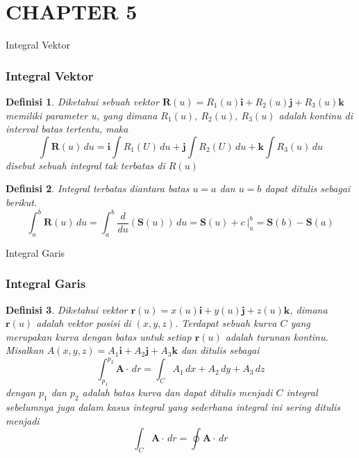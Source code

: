 \documentclass[10pt]{beamer}
\newtheorem{definisi}{Definisi}
\begin{document}
\section{CHAPTER 5}
\begin{frame}{Integral Vektor}
    \frametitle{Integral Vektor}
    \justifying
    \begin{definisi}
    Diketahui sebuah vektor $\mathbf{R}(u) = R_1(u)\mathbf{i} + R_{2}(u)\mathbf{j} + R_{3}(u)\mathbf{k}$ memiliki parameter u, yang dimana $R_{1}(u),\ R_{2}(u),\ R_{3}(u)$ adalah kontinu di interval batas tertentu, maka
    \[\int \mathbf{R}(u)\, du = \mathbf{i} \int R_{1}(U)\, du + \mathbf{j} \int R_{2}(U)\, du + \mathbf{k} \int R_{3}(u)\, du\]
    disebut sebuah integral tak terbatas di $R(u)$
    \end{definisi}
    \begin{definisi}
        Integral terbatas diantara batas $u = a$ dan $u = b$ dapat ditulis sebagai berikut.
        \[\int_{a}^{b} \mathbf{R}(u)\, du = \int_{a}^{b} \dfrac{d}{du} \left(\mathbf{S}(u)\right)\, du = \mathbf{S}(u) + c\ |_{a}^{b} = \mathbf{S}(b) - \mathbf{S}(a)\]
    \end{definisi}
\end{frame}

\begin{frame}{Integral Garis}
    \frametitle{Integral Garis}
    \justifying
    \begin{definisi}
       Diketahui vektor $\mathbf{r}(u) = x(u) \mathbf{i} + y(u) \mathbf{j} + z(u) \mathbf{k}$, dimana $\mathbf{r}(u)$ adalah vektor posisi di $(x,y,z)$. Terdapat sebuah kurva $C$ yang merupakan kurva dengan batas untuk setiap $\mathbf{r}(u)$ adalah turunan kontinu. Misalkan $A(x,y,z) = A_{1} \mathbf{i} + A_{2} \mathbf{j} + A_{3} \mathbf{k}$ dan ditulis sebagai
       \[\int_{p_{1}}^{p_{2}} \mathbf{A} \cdot\, dr = \int_{C} A_{1}\, dx + A_{2}\, dy + A_{3}\, dz\]
       dengan $p_{1}$ dan $p_{2}$ adalah batas kurva dan dapat ditulis menjadi $C$ integral sebelumnya juga dalam kasus integral yang sederhana integral ini sering ditulis menjadi
       \[\int_{C} \mathbf{A} \cdot\, dr = \oint \mathbf{A} \cdot\, dr\]
    \end{definisi}
\end{frame}
\end{document}
